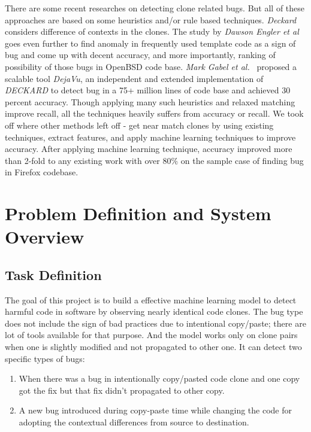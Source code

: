 \documentclass[nocopyrightspace]{sigplanconf}
\begin{document}
\vspace{10 pt}
There are some recent researches on detecting clone related bugs. But all of these approaches are based on some heuristics and/or rule based techniques. \emph{Deckard}~\cite{Jiang2007} considers difference of contexts in the clones. The study by \emph{Dawson Engler et al}~\cite{Engler2001} goes even further to find anomaly in frequently used template code as a sign of bug and come up with decent accuracy, and more importantly, ranking of possibility of those bugs in OpenBSD code base. \emph{Mark Gabel et al.}~\cite{Gabel2010} proposed a scalable tool \emph{DejaVu}, an independent and extended implementation of \emph{DECKARD} to detect bug in a 75+ million lines of code base and achieved 30 percent accuracy. Though applying many such heuristics and relaxed matching improve recall, all the techniques heavily suffers from accuracy or recall. We took off where other methods left off - get near match clones by using existing techniques, extract features, and apply machine learning techniques to improve accuracy. After applying machine learning technique, accuracy improved more than 2-fold to any existing work with over $80\%$ on the sample case of finding bug in Firefox codebase.

\section{Problem Definition and System Overview}
\subsection{Task Definition}
The goal of this project is to build a effective machine learning model to detect harmful code in software by observing nearly identical code clones. The bug type does not include the sign of bad practices due to intentional copy/paste; there are lot of tools available for that purpose. And the model works only on clone pairs when one is slightly modified and not propagated to other one. It can detect two specific types of bugs:

\begin{enumerate}
\item When there was a bug in intentionally copy/pasted code clone and one copy got the fix but that fix didn’t propagated to other copy.
\item A new bug introduced during copy-paste time while changing the code for adopting the contextual differences from source to destination.
\end{enumerate}
\end{document}
